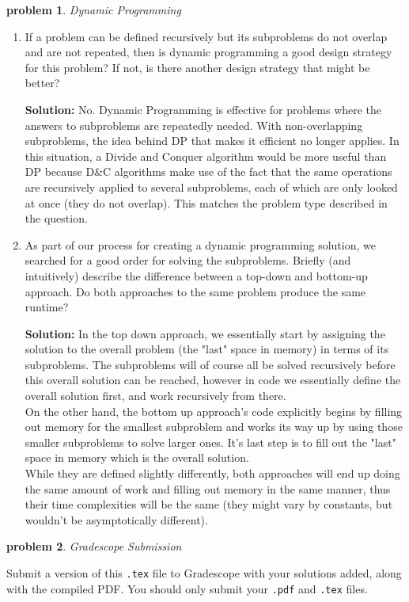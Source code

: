 \documentclass[10pt]{article}
\newcommand{\solution}[1]{\color{blue}\hfill\break\noindent\textbf{Solution:} #1\color{black}}
\newtheorem{problem}{\sc\color{cit}problem}
\begin{document}
\begin{problem}Dynamic Programming\end{problem}
\begin{enumerate}
\item If a problem can be defined recursively but its subproblems do not overlap and are not repeated, then is dynamic programming a good design strategy for this problem?  If not, is there another design strategy that might be better?

    \solution{
        No. Dynamic Programming is effective for problems where the answers to subproblems are repeatedly needed. With non-overlapping subproblems, the idea behind DP that makes it efficient no longer applies. In this situation, a Divide and Conquer algorithm would be more useful than DP because D\&C algorithms make use of the fact that the same operations are recursively applied to several subproblems, each of which are only looked at once (they do not overlap). This matches the problem type described in the question.
    }
\item As part of our process for creating a dynamic programming solution, we searched for a good order for solving the subproblems.  Briefly (and intuitively) describe the difference between a top-down and bottom-up approach.  Do both approaches to the same problem produce the same runtime?

    \solution{
        In the top down approach, we essentially start by assigning the solution to the overall problem (the "last" space in memory) in terms of its subproblems. The subproblems will of course all be solved recursively before this overall solution can be reached, however in code we essentially define the overall solution first, and work recursively from there. \\
        On the other hand, the bottom up approach's code explicitly begins by filling out memory for the smallest subproblem and works its way up by using those smaller subproblems to solve larger ones. It's last step is to fill out the "last" space in memory which is the overall solution. \\
        While they are defined slightly differently, both approaches will end up doing the same amount of work and filling out memory in the same manner, thus their time complexities will be the same (they might vary by constants, but wouldn't be asymptotically different).
    }
\end{enumerate}

\begin{problem} Gradescope Submission \end{problem}
Submit a version of this \verb|.tex| file to Gradescope with your solutions added, along with the compiled PDF.  You should only submit your \verb|.pdf| and \verb|.tex| files.
\end{document}
